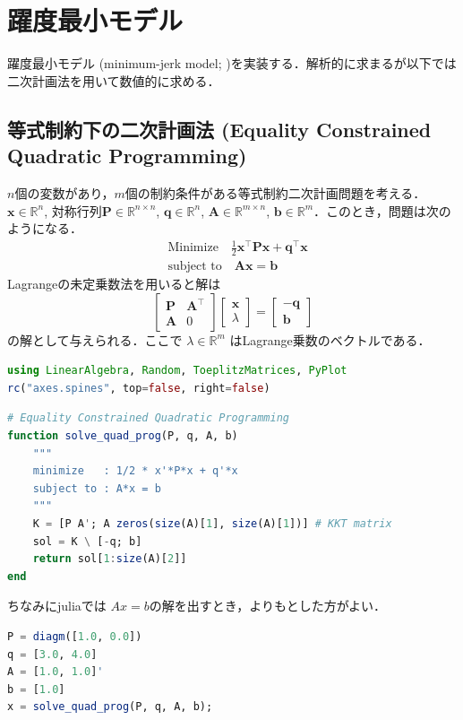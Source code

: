 \section{躍度最小モデル}
躍度最小モデル (minimum-jerk model; \citep{Flash1985-vj})を実装する．解析的に求まるが以下では二次計画法を用いて数値的に求める．
\subsection{等式制約下の二次計画法 (Equality Constrained Quadratic Programming)}
$n$個の変数があり，$m$個の制約条件がある等式制約二次計画問題を考える．$\mathbf {x}\in \mathbb{R}^n$, 対称行列$\mathbf{P}\in \mathbb{R}^{n\times n}$,  $\mathbf {q}\in \mathbb{R}^{n}$, $\mathbf{A}\in \mathbb{R}^{m\times n}$, $\mathbf {b}\in \mathbb{R}^m$．このとき，問題は次のようになる．
\begin{align}
&{\text{Minimize}}\quad {\frac {1}{2}}\mathbf {x}^\top \mathbf{P}\mathbf {x} +\mathbf {q} ^{\top}\mathbf {x}\\
&{\text{subject to}}\quad \mathbf{A}\mathbf {x} =\mathbf {b}
\end{align}
Lagrangeの未定乗数法を用いると解は
\begin{equation}
{\begin{bmatrix}\mathbf{P}&\mathbf{A}^\top\\\mathbf{A}&0\end{bmatrix}}{\begin{bmatrix}\mathbf {x} \\
\lambda \end{bmatrix}}={\begin{bmatrix}-\mathbf {q} \\\mathbf {b} \end{bmatrix}}
\end{equation}
の解として与えられる．ここで $\lambda \in \mathbb{R}^{m}$  はLagrange乗数のベクトルである．
\begin{lstlisting}[language=julia]
using LinearAlgebra, Random, ToeplitzMatrices, PyPlot
rc("axes.spines", top=false, right=false)
\end{lstlisting}
\begin{lstlisting}[language=julia]
# Equality Constrained Quadratic Programming
function solve_quad_prog(P, q, A, b)
    """
    minimize   : 1/2 * x'*P*x + q'*x
    subject to : A*x = b
    """
    K = [P A'; A zeros(size(A)[1], size(A)[1])] # KKT matrix
    sol = K \ [-q; b] 
    return sol[1:size(A)[2]]
end
\end{lstlisting}
ちなみにjuliaでは $Ax=b$の解を出すとき，よりもとした方がよい．
\begin{lstlisting}[language=julia]
P = diagm([1.0, 0.0])
q = [3.0, 4.0]
A = [1.0, 1.0]'
b = [1.0]
x = solve_quad_prog(P, q, A, b);
\end{lstlisting}

